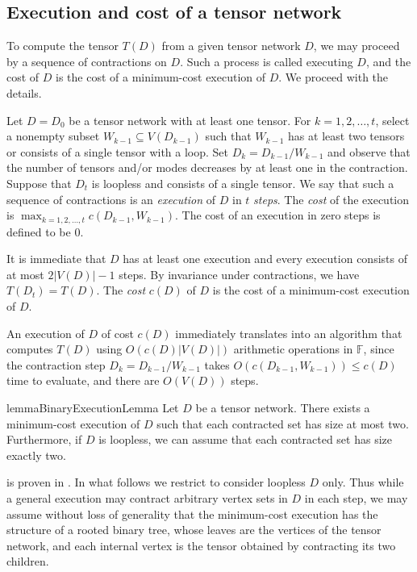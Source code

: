 \documentclass{toc}
\newcommand{\F}{\ensuremath{\mathbb{F}}}
\begin{document}
\subsection{Execution and cost of a tensor network}

To compute the tensor $T(D)$ from a given tensor network $D$,
we may proceed by a sequence of contractions on $D$. Such a process is called
executing $D$, and the cost of $D$ is the cost of a minimum-cost execution of $D$. We proceed with the details.

Let $D=D_0$ be a tensor network with at least one tensor.
For $k=1,2,\ldots,t$, select a nonempty
subset $W_{k-1}\subseteq V(D_{k-1})$ such that $W_{k-1}$ has at least two
tensors or consists of a single tensor with a loop.
Set $D_k=D_{k-1}/W_{k-1}$ and observe that the number of tensors and/or modes
decreases by at least one in the contraction.
Suppose that $D_t$ is loopless and consists of a single tensor.
We say that such a sequence of contractions is an \emph{execution} of $D$
in $t$ \emph{steps}.
The \emph{cost} of the execution is
$\max_{k=1,2,\ldots,t} c(D_{k-1},W_{k-1})$.
The cost of an execution in zero steps is defined to be $0$.

It is immediate that $D$ has at least one execution and every
execution consists of at most $2|V(D)|-1$ steps.  By invariance under
contractions, we have $T(D_t) = T(D)$.
The \emph{cost} $c(D)$ of $D$ is the cost of a minimum-cost execution of $D$.

An execution of $D$ of cost $c(D)$ immediately translates into an
algorithm that computes $T(D)$ using $O(c(D)|V(D)|)$ arithmetic
operations in $\F$, since the contraction step $D_{k} =
D_{k-1}/W_{k-1}$ takes $O(c(D_{k-1}, W_{k-1})) \le c(D)$ time to
evaluate, and there are $O(V(D))$ steps.

\begin{restatable}{lemma}{BinaryExecutionLemma}
\label{lem:binary}
Let $D$ be a tensor network.
There exists a minimum-cost execution of $D$ such that each contracted
set has size at most two. Furthermore, if $D$ is loopless,
we can assume that each contracted set has size exactly two.
\end{restatable}

  is proven in .
In what follows we restrict to consider loopless $D$ only.
Thus while a general execution may contract arbitrary vertex sets in
$D$ in each step, we may assume without loss of generality that
the minimum-cost execution has the structure of a rooted binary tree,
whose leaves are the vertices of the tensor network, and each internal
vertex is the tensor obtained by contracting its two children.
\end{document}
